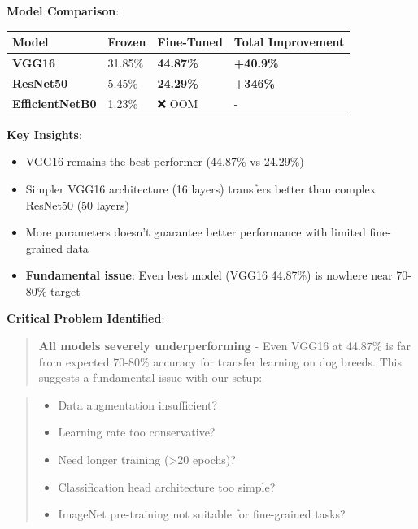 \documentclass[
  letterpaper,
  DIV=11,
  numbers=noendperiod]{scrartcl}
\providecommand{\tightlist}{%
  \setlength{\itemsep}{0pt}\setlength{\parskip}{0pt}}
\begin{document}
\textbf{Model Comparison}:

\begin{longtable}[]{@{}llll@{}}
\toprule\noalign{}
Model & Frozen & Fine-Tuned & Total Improvement \\
\midrule\noalign{}
\endhead
\bottomrule\noalign{}
\endlastfoot
\textbf{VGG16} & 31.85\% & \textbf{44.87\%} & \textbf{+40.9\%} 🥇 \\
\textbf{ResNet50} & 5.45\% & \textbf{24.29\%} & \textbf{+346\%} 🥈 \\
\textbf{EfficientNetB0} & 1.23\% & ❌ OOM & - \\
\end{longtable}

\textbf{Key Insights}:

\begin{itemize}
\tightlist
\item
  VGG16 remains the best performer (44.87\% vs 24.29\%)
\item
  Simpler VGG16 architecture (16 layers) transfers better than complex
  ResNet50 (50 layers)
\item
  More parameters doesn't guarantee better performance with limited
  fine-grained data
\item
  \textbf{Fundamental issue}: Even best model (VGG16 44.87\%) is nowhere
  near 70-80\% target
\end{itemize}

\textbf{Critical Problem Identified}:

\begin{quote}
\textbf{All models severely underperforming} - Even VGG16 at 44.87\% is
far from expected 70-80\% accuracy for transfer learning on dog breeds.
This suggests a fundamental issue with our setup:
\end{quote}

\begin{quote}
\begin{itemize}
\tightlist
\item
  Data augmentation insufficient?
\item
  Learning rate too conservative?
\item
  Need longer training (\textgreater20 epochs)?
\item
  Classification head architecture too simple?
\item
  ImageNet pre-training not suitable for fine-grained tasks?
\end{itemize}
\end{quote}
\end{document}
